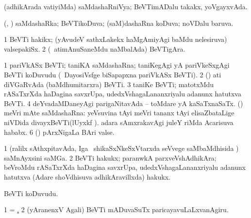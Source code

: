 {{{{{{{{{{{\noindent 
\gl{\pagu}
\expl{}
\bmng
\emng
\eentry

\bentry
{} 
 \gl{\gu} \bmng
 (adhikArada vatiyiMda) saMdashaRniVya; BeVTimADalu takakx, yoVgayxvAda. 
\emng
\eentry

\bentry
{} 
\gl{\gu}
\expl{}
\bmng
 (\pArxparx, \kAparx) saMdashaRka; BeVTikoDuva; (saM)dashaRna koDuva; noVDalu baruva. 
\emng
\eentry

\bentry 
{} 
\gl{\nA}
\expl{}
\bmng
\bnum
\num{1} BeVTi hakikx; (yAvudeV sathxLakekx haMgAmiyAgi baMdu nelesiruva) valsepakiSx. 
\num{2} (\kanmu\ atimAnuSaneMdu naMbalAda) BeVTigAra. 
\enum
\emng
\eentry

\bentry
{} 
\gl{\nA}
\expl{}
\bmng
\bnum
\num{1} pariVkASx BeVTi; taniKA saMdashaRna; taniKegAgi yA pariVkeSxgAgi BeVTi koDuvudu (\kanmu\ DayosiVsfge biSapapxna pariVkASx BeVTi). 
\num{2} (\AmA) ati diVGaRvAda (baMdhumitarxra) BeVTi. 
\num{3} taniKe BeVTi; matotxMdu rASaTxrXda haDagina savxrUpa, udedxVshagaLananxriyalu adanunx hatutxva BeVTi. 
\num{4} deYvadaMDaneyAgi parigaNitavAda -- toMdare yA kaSaTxnaSaTx. 
 () meVri mAte saMdashaRna: 
\banum
{} yeVsuvina tAyi meVri tananx tAyi elisaZbataLige niVDida divayxBeVTi(lUyxkf ). 
 adara sAmxrakavAgi juleY riMda Acarisuva hababx. 
\eanum
\numie
\num{6} (\pArxvi) pArxNigaLa BAri valse. 
\enum
\emng

\noindent 
\gl{\pagu}
\expl{}
\bmng
\bnum
\num{1}  (ralilx sAthxpitavAda, Iga \kanmu\ shikaSxNkeSxVtarxda seVvege saMbaMdhisida \roVkAyx) saMnAyxsini saMGa. 
\hypertarget{visitation pagu(2)}{} 
\num{2}  BeVTi hakukx; paranwkA parxveVshAdhikAra; beVroMdu rASaTxrXda haDagina savxrUpa, udedxVshagaLananxriyalu adanunx hatutxva (Adare shoVdhisuva adhikAravillxda) hakukx. 
\enum
\emng
\eentry

\bentry 
{} 
\gl{\gu}
\expl{}
\bmng
\emng
\eentry

\bentry
{} 
\gl{\nA}
\expl{}
\bmng
BeVTi koDuvudu. 
\emng

\noindent
\gl{\pagu}
\bmng
\bnum
\num{1}  = \hyperlink{visiting pagu2}{\pagu {}.} 
\hypertarget{visiting pagu2}{} 
\num{2} (yAranenxV Agali) BeVTi mADuvaSuTx paricayavuLaLxvanAgiru. 
\enum
\emng
\eentry

}}}}}}}}}}}
